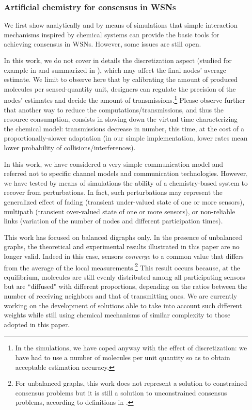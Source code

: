 \documentclass[journal]{IEEEtran}
\begin{document}
{\subsubsection{Artificial chemistry for consensus in WSNs}
{We first show analytically and by means of simulations that simple interaction mechanisms inspired by chemical systems can provide the basic tools for achieving consensus in WSNs. However, some issues are still open.}

{In this work, we do not cover in details the discretization aspect (studied for example in \cite{CaFa10} and summarized in \cite{DiKa10}), which may affect the final nodes' average-estimate. We limit to observe here that by calibrating the amount of produced molecules per sensed-quantity unit, designers can regulate the precision of the nodes' estimates and decide the amount of transmissions.\footnote{In the simulations, we have coped anyway with the effect of discretization: we have had to use a number of molecules per unit quantity so as to obtain acceptable estimation accuracy.} 
Please observe further that another way to reduce the computations/transmissions, and thus the {resource consumption}, consists in slowing down the virtual time characterizing the chemical model: transmissions decrease in number, this time, at the cost of a proportionally-slower adaptation (in our simple implementation, lower rates mean lower probability of collisions/interferences).}

{In this work, we have {considered a very simple communication model and referred not to} specific channel models and communication technologies. However, we have tested by means of simulations the ability of a chemistry-based system to recover from perturbations. In fact, such perturbations may represent the generalized effect of fading (transient under-valued state of one or more sensors), multipath (transient over-valued state of one or more sensors), or non-reliable links (variation of the number of nodes and different participation times).  
}

{This work has focused on balanced digraphs only. In the presence of unbalanced graphs, the theoretical and experimental results illustrated in this paper are no longer valid. Indeed in this case, sensors \emph{converge} to a common value that differs from the average of the local measurements.\footnote{For unbalanced graphs, this work does not represent a solution to constrained consensus problems but it is still a solution to unconstrained consensus problems, according to definitions in \cite{OlFa07}.} This result occurs because, at the equilibrium, molecules are still evenly distributed among all participating sensors but {are ``diffused" with different proportions}, depending on the ratios between the number of receiving neighbors and that of transmitting ones. We are currently working on the development of solutions able to take into account such different weights while still using chemical mechanisms of similar complexity to those adopted in this paper. }

}
\end{document}
